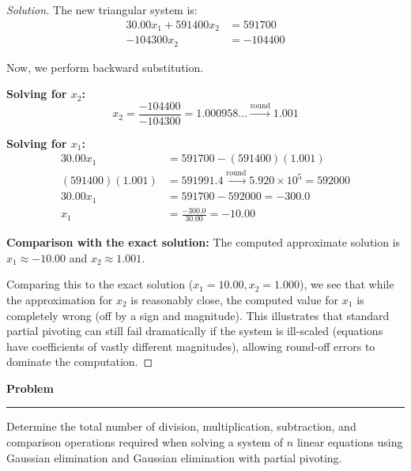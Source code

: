\documentclass[11pt, a4paper]{article}
\newenvironment{problem}{%
  \begin{tcolorbox}[
    colback=blue!4!white,
    colframe=blue!38!black,
    boxrule=0.95pt,
    arc=3pt,
    left=11pt,
    right=11pt,
    top=10pt,
    bottom=11pt,
    before skip=12pt,
    after skip=14pt,
  ]
  \noindent\textbf{\textcolor{blue!35!black}{Problem}}\par\nointerlineskip
  {\color{blue!42!black}\rule{\linewidth}{0.55pt}}\par\vspace{0.55em}%
}{%
  \end{tcolorbox}%
}
\newif\ifsolutionnewpage
\newenvironment{solution}
  {\begin{proof}[Solution]}
  {\end{proof}\ifsolutionnewpage\newpage\fi}
\begin{document}
\begin{solution}
    The new triangular system is:
    \begin{align*}
        30.00x_{1} + 591400x_{2} &= 591700 \\
        -104300x_{2} &= -104400
    \end{align*}

    Now, we perform backward substitution. 
    
    \textbf{Solving for $x_2$:}
    \[
    x_2 = \frac{-104400}{-104300} = 1.000958\dots \xrightarrow{\text{round}} 1.001
    \]

    \textbf{Solving for $x_1$:}
    \begin{align*}
        30.00x_1 &= 591700 - (591400)(1.001) \\
        (591400)(1.001) &= 591991.4 \xrightarrow{\text{round}} 5.920 \times 10^5 = 592000 \\
        30.00x_1 &= 591700 - 592000 = -300.0 \\
        x_1 &= \frac{-300.0}{30.00} = -10.00
    \end{align*}

    \textbf{Comparison with the exact solution:}
    The computed approximate solution is $x_1 \approx -10.00$ and $x_2 \approx 1.001$. 
    
    Comparing this to the exact solution ($x_1 = 10.00, x_2 = 1.000$), we see that while the approximation for $x_2$ is reasonably close, the computed value for $x_1$ is completely wrong (off by a sign and magnitude). This illustrates that standard partial pivoting can still fail dramatically if the system is ill-scaled (equations have coefficients of vastly different magnitudes), allowing round-off errors to dominate the computation.
\end{solution}

\begin{problem}
    Determine the total number of division, multiplication, subtraction, and comparison operations required when solving a system of $n$ linear equations using Gaussian elimination and Gaussian elimination with partial pivoting.
\end{problem}
\end{document}
